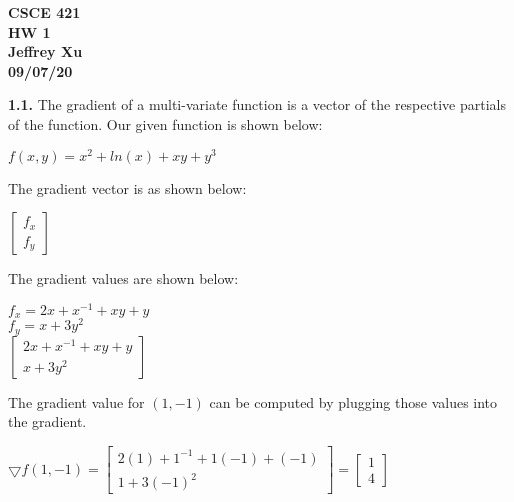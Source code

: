 \documentclass[12pt]{article}
\begin{document}
\begin{center}

{\bf
CSCE 421\\
HW 1\\
Jeffrey Xu\\
09/07/20\\
}

\end{center}

{\bf 1.1.} The gradient of a multi-variate function is a vector of the respective partials of the function. Our given function is shown below:

\begin{center}

$f(x,y)=x^{2}+ln(x)+xy+y^{3}$\\

\end{center}

The gradient vector is as shown below:

\begin{center}

$\begin{bmatrix}
f_{x}\\
f_{y}
\end{bmatrix}
$\\

\end{center}

The gradient values are shown below:

\begin{center}

$f_{x}=2x+x^{-1}+xy+y$\\
\bigskip
$f_{y}=x+3y^{2}$\\
\bigskip
$
\begin{bmatrix}
2x+x^{-1}+xy+y\\
x+3y^{2}
\end{bmatrix}
$
\end{center}

The gradient value for $(1,-1)$ can be computed by plugging those values into the gradient.

\begin{center}

$
\bigtriangledown f(1,-1)=
\begin{bmatrix}
2(1)+1^{-1}+1(-1)+(-1)\\
1+3(-1)^{2}
\end{bmatrix}=
\begin{bmatrix}
1\\
4
\end{bmatrix}
$

\end{center}
\end{document}
